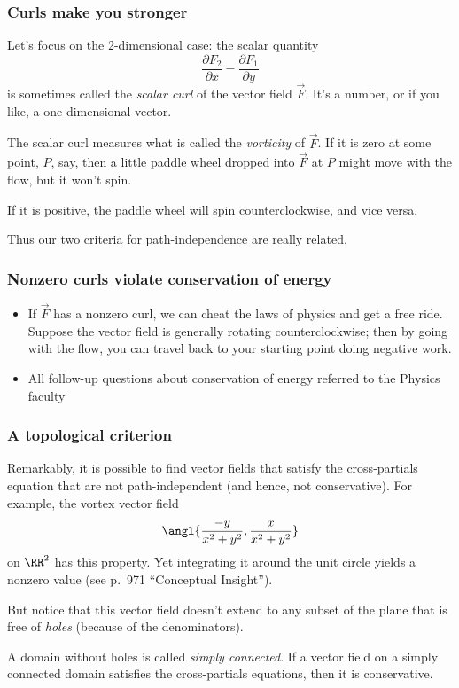 \documentclass[11pt,ignorenonframetext,aspectratio=169,xcolor={svgnames}]{beamer}
\begin{document}
\begin{frame}\frametitle{Curls make you stronger}

Let's focus on the 2-dimensional case: the scalar quantity
\[ \frac{\partial F_2}{\partial x} - \frac{\partial F_1}{\partial y} \]
is sometimes called the \emph{scalar curl} of the vector field
$\vec{F}$. It's a number, or if you like, a one-dimensional vector.

The scalar curl measures what is called the \emph{vorticity} of
$\vec{F}$. If it is zero at some point, $P$, say, then a little paddle
wheel dropped into $\vec{F}$ at $P$ might move with the flow, but it
won't spin.

If it is positive, the paddle wheel will spin counterclockwise, and vice
versa.

Thus our two criteria for path-independence are really related.

\end{frame}

\begin{frame}\frametitle{Nonzero curls violate conservation of energy}

\begin{itemize}[<+->]
\itemsep1pt\parskip0pt
\item
  If $\vec{F}$ has a nonzero curl, we can cheat the laws of physics and
  get a free ride. Suppose the vector field is generally rotating
  counterclockwise; then by going with the flow, you can travel back to
  your starting point doing negative work.
\item
  All follow-up questions about conservation of energy referred to the
  Physics faculty
\end{itemize}

\end{frame}

\begin{frame}\frametitle{A topological criterion}

Remarkably, it is possible to find vector fields that satisfy the
cross-partials equation that are not path-independent (and hence, not
conservative). For example, the vortex vector field
\[ \angl{ \frac{-y}{x^2 + y^2}, \frac{x}{x^2 + y^2} } \] on $\RR^2$ has
this property. Yet integrating it around the unit circle yields a
nonzero value (see p.~971 ``Conceptual Insight'').

But notice that this vector field doesn't extend to any subset of the
plane that is free of \emph{holes} (because of the denominators).

A domain without holes is called \emph{simply connected}. If a vector
field on a simply connected domain satisfies the cross-partials
equations, then it is conservative.

\end{frame}
\end{document}
